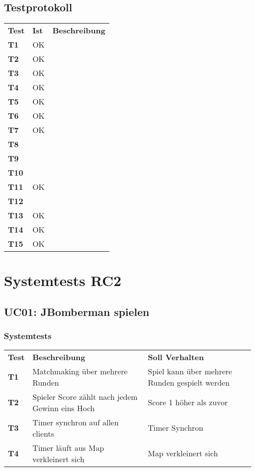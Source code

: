 \documentclass[11pt]{scrartcl}
\begin{document}
\subsection{Testprotokoll}
\begin{tabularx}{\linewidth}{l l X}
  \bf{Test} & \bf{Ist} & \bf{Beschreibung} \\
  \bf{T1} & OK & \\
  \bf{T2} & OK &  \\
  \bf{T3} & OK  & \\
  \bf{T4} & OK &  \\
  \bf{T5} & OK & \\
  \bf{T6} & OK &  \\
  \bf{T7} & OK & \\
  \bf{T8} & &  \\
  \bf{T9} & & \\
  \bf{T10} & & \\
  \bf{T11} & OK & \\
  \bf{T12} & & \\
  \bf{T13} & OK &  \\
  \bf{T14} & OK &  \\
  \bf{T15} & OK & \\
\end{tabularx}

\section{Systemtests RC2}
\subsection{UC01: JBomberman spielen}
\subsubsection{Systemtests}
\begin{tabularx}{\linewidth}{l X X}
  \bf{Test} & \bf{Beschreibung} & \bf{Soll Verhalten} \\
 \bf{T1} & Matchmaking über mehrere Runden & Spiel kann über mehrere 
 Runden gespielt werden \\
 \bf{T2} & Spieler Score zählt nach jedem Gewinn eins Hoch & Score 1 höher als 
 zuvor \\
 \bf{T3} & Timer synchron auf allen clients & Timer Synchron \\
 \bf{T4} & Timer läuft aus Map verkleinert sich & Map verkleinert sich \\
 
 \end{tabularx}
\end{document}

